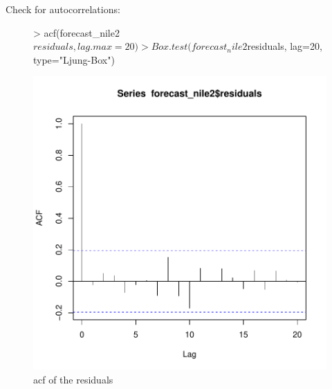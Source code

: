 \documentclass[11pt, a4paper]{article} %
\begin{document}
Check for autocorrelations:
\begin{figure}
\centering
\begin{Schunk}
\begin{Sinput}
> acf(forecast_nile2$residuals, lag.max = 20)
> Box.test(forecast_nile2$residuals, lag=20, type="Ljung-Box")
\end{Sinput}
\end{Schunk}
\includegraphics{alles-043}
\caption{acf of the residuals}
\end{figure}
\end{document}

